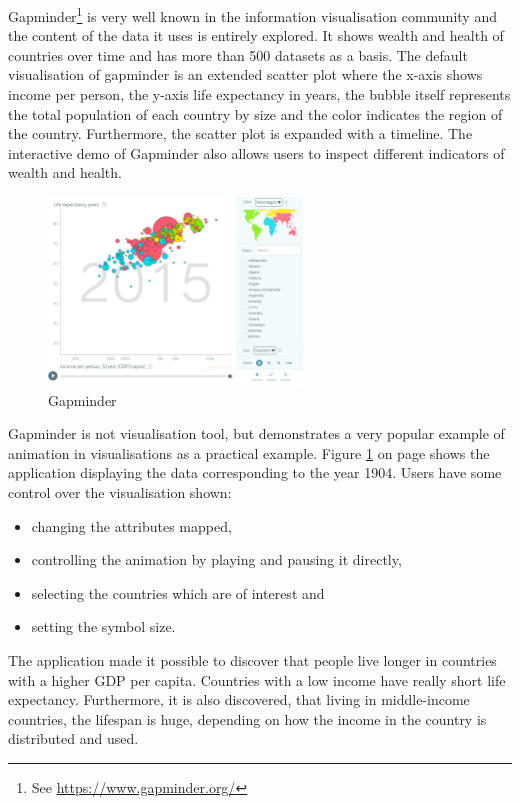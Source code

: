 Gapminder\footnote{See \href{https://www.gapminder.org/}{https://www.gapminder.org/}} is very well known in the information visualisation community and the content of the data it uses is entirely explored. It shows wealth and health of countries over time and has more than 500 datasets as a basis. The default visualisation of gapminder is an extended scatter plot where the x-axis shows income per person, the y-axis life expectancy in years, the bubble itself represents the total population of each country by size and the color indicates the region of the country. Furthermore, the scatter plot is expanded with a timeline. The interactive demo of Gapminder also allows users to inspect different indicators of wealth and health.

\begin{figure}[!htb]
\centering
\includegraphics[height=5cm]{images/methods/related/gapminder.png}
\caption[
    Gapminder
]{Gapminder}
\label{fig:gapminder}
\end{figure}

Gapminder is not visualisation tool, but demonstrates a very popular example of animation in visualisations as a practical example. Figure \ref{fig:gapminder} on page \pageref{fig:gapminder} shows the application displaying the data corresponding to the year 1904. Users have some control over the visualisation shown:
\begin{itemize}
\item changing the attributes mapped,
\item controlling the animation by playing and pausing it directly,
\item selecting the countries which are of interest and
\item setting the symbol size.
\end{itemize}

The application made it possible to discover that people live longer in countries with a higher \ac{GDP} per capita. Countries with a low income have really short life expectancy. Furthermore, it is also discovered, that living in middle-income countries, the lifespan is huge, depending on how the income in the country is distributed and used.
